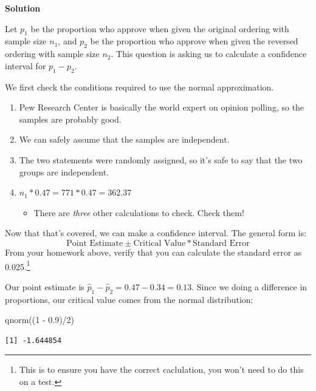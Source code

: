 \documentclass[
  letterpaper,
  DIV=11,
  numbers=noendperiod,
  oneside]{scrreprt}
\newenvironment{Shaded}{\begin{snugshade}}{\end{snugshade}}
\newcommand{\DecValTok}[1]{\textcolor[rgb]{0.68,0.00,0.00}{#1}}
\newcommand{\FloatTok}[1]{\textcolor[rgb]{0.68,0.00,0.00}{#1}}
\newcommand{\FunctionTok}[1]{\textcolor[rgb]{0.28,0.35,0.67}{#1}}
\newcommand{\NormalTok}[1]{\textcolor[rgb]{0.00,0.23,0.31}{#1}}
\newcommand{\SpecialCharTok}[1]{\textcolor[rgb]{0.37,0.37,0.37}{#1}}
\providecommand{\tightlist}{%
  \setlength{\itemsep}{0pt}\setlength{\parskip}{0pt}}\usepackage{longtable,booktabs,array}
\begin{document}
\textbf{Solution}

Let \(p_1\) be the proportion who approve when given the original
ordering with sample size \(n_1\), and \(p_2\) be the proportion who
approve when given the reversed ordering with sample size \(n_2\). This
question is asking us to calculate a confidence interval for
\(p_1 - p_2\).

We first check the conditions required to use the normal approximation.

\begin{enumerate}
\def\labelenumi{\arabic{enumi}.}
\tightlist
\item
  Pew Research Center is basically the world expert on opinion polling,
  so the samples are probably good.
\item
  We can safely assume that the samples are independent.
\item
  The two statements were randomly assigned, so it's safe to say that
  the two groups are independent.
\item
  \(n_1 * 0.47 = 771 * 0.47 = 362.37\)

  \begin{itemize}
  \tightlist
  \item
    There are \emph{three} other calculations to check. Check them!
  \end{itemize}
\end{enumerate}

Now that that's covered, we can make a confidence interval. The general
form is: \[
\text{Point Estimate}\pm\text{Critical Value}*\text{Standard Error}
\] From your homework above, verify that you can calculate the standard
error as 0.025.\footnote{This is to ensure you have the correct
  caclulation, you won't need to do this on a test.}

Our point estimate is \(\hat p_1 - \hat p_2 = 0.47 - 0.34 = 0.13\).
Since we doing a difference in proportions, our critical value comes
from the normal distribution:

\begin{Shaded}
\begin{Highlighting}[]
\FunctionTok{qnorm}\NormalTok{((}\DecValTok{1} \SpecialCharTok{{-}} \FloatTok{0.9}\NormalTok{)}\SpecialCharTok{/}\DecValTok{2}\NormalTok{)}
\end{Highlighting}
\end{Shaded}

\begin{verbatim}
[1] -1.644854
\end{verbatim}
\end{document}
